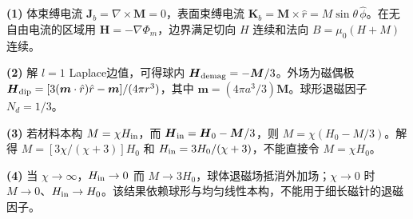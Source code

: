 \par\noindent\textbf{(1)} 体束缚电流 \(\boldsymbol J_b=\nabla\times\boldsymbol M=0\)，表面束缚电流 \(\boldsymbol K_b=\boldsymbol M\times\hat r=M\sin\theta\,\hat\phi\)。在无自由电流的区域用 \(\boldsymbol H=-\nabla\Phi_m\)，边界满足切向 \(H\) 连续和法向 \(B=\mu_0(H+M)\) 连续。
\par\noindent\textbf{(2)} 解 \(l=1\) Laplace边值，可得球内 \(\boldsymbol H_{\rm demag}=-\boldsymbol M/3\)。外场为磁偶极 \(\boldsymbol H_{\rm dip}=[3(\boldsymbol m\cdot\hat r)\hat r-\boldsymbol m]/(4\pi r^3)\)，其中 \(\boldsymbol m=(4\pi a^3/3)\boldsymbol M\)。球形退磁因子 \(N_d=1/3\)。
\par\noindent\textbf{(3)} 若材料本构 \(M=\chi H_{\rm in}\)，而 \(\boldsymbol H_{\rm in}=\boldsymbol H_0-\boldsymbol M/3\)，则 \(M=\chi(H_0-M/3)\)。解得 \(M=[3\chi/(\chi+3)]H_0\) 和 \(H_{\rm in}=3H_0/(\chi+3)\)，不能直接令 \(M=\chi H_0\)。
\par\noindent\textbf{(4)} 当 \(\chi\to\infty\)，\(H_{\rm in}\to0\) 而 \(M\to3H_0\)，球体退磁场抵消外加场；\(\chi\to0\) 时 \(M\to0\)、\(H_{\rm in}\to H_0\)。该结果依赖球形与均匀线性本构，不能用于细长磁针的退磁因子。
